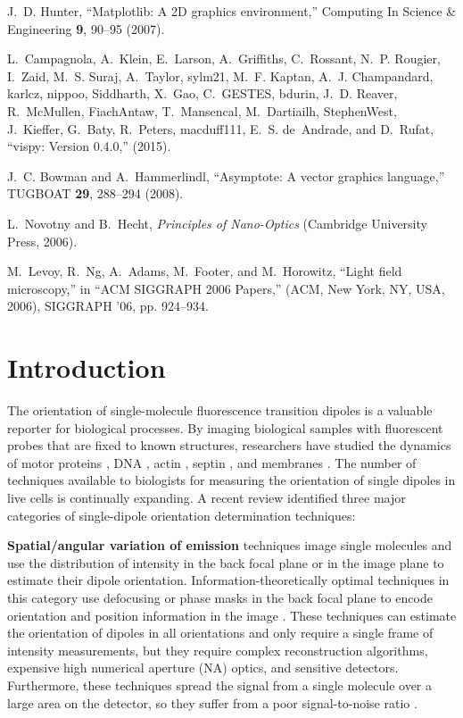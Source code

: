 \documentclass[10pt]{article}
\begin{document}
\begin{thebibliography}{10}
J.~D. Hunter, \enquote{Matplotlib: A {2D} graphics environment,} Computing In
  Science \& Engineering \textbf{9}, 90--95 (2007).

L.~Campagnola, A.~Klein, E.~Larson, A.~Griffiths, C.~Rossant, N.~P. Rougier,
  I.~Zaid, M.~S. Suraj, A.~Taylor, sylm21, M.~F. Kaptan, A.~J. Champandard,
  karlcz, nippoo, Siddharth, X.~Gao, C.~GESTES, bdurin, J.~D. Reaver,
  R.~McMullen, FiachAntaw, T.~Mansencal, M.~Dartiailh, StephenWest, J.~Kieffer,
  G.~Baty, R.~Peters, macduff111, E.~S. de~Andrade, and D.~Rufat,
  \enquote{vispy: Version 0.4.0,}  (2015).

J.~C. Bowman and A.~Hammerlindl, \enquote{Asymptote: A vector graphics
  language,} TUGBOAT \textbf{29}, 288--294 (2008).

L.~Novotny and B.~Hecht, \emph{Principles of Nano-Optics} (Cambridge University
  Press, 2006).

M.~Levoy, R.~Ng, A.~Adams, M.~Footer, and M.~Horowitz, \enquote{Light field
  microscopy,} in \enquote{ACM SIGGRAPH 2006 Papers,}  (ACM, New York, NY, USA,
  2006), SIGGRAPH '06, pp. 924--934.

\end{thebibliography}


\section{Introduction}
The orientation of single-molecule fluorescence transition dipoles is a valuable
reporter for biological processes. By imaging biological samples with
fluorescent probes that are fixed to known structures, researchers have studied
the dynamics of motor proteins \cite{peterman2001, forkey2003}, DNA
\cite{backer2016}, actin \cite{mehta2016}, septin \cite{demay2011,
  mcquilken2017}, and membranes \cite{anantharam2010}. The number of techniques
available to biologists for measuring the orientation of single dipoles in live
cells is continually expanding. A recent review \cite{backlund2014} identified
three major categories of single-dipole orientation determination techniques:

\textbf{Spatial/angular variation of emission} techniques image single molecules
and use the distribution of intensity in the back focal plane \cite{lieb2004} or
in the image plane \cite{backer2014} to estimate their dipole
orientation. Information-theoretically optimal techniques in this category use
defocusing or phase masks in the back focal plane to encode orientation and
position information in the image \cite{agrawal2012}. These techniques can
estimate the orientation of dipoles in all orientations and only require a
single frame of intensity measurements, but they require complex reconstruction
algorithms, expensive high numerical aperture (NA) optics, and sensitive
detectors. Furthermore, these techniques spread the signal from a single
molecule over a large area on the detector, so they suffer from a poor
signal-to-noise ratio \cite{toprak2006}.
\end{document}
